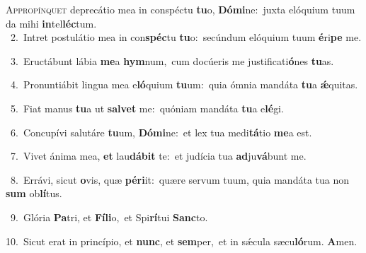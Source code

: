 \lettrine{\initial\textcolor{\initialcolor}{A}}{ppropínquet} deprecátio mea in conspéctu \textbf{tu}\-o, \textbf{Dó}\-\textbf{mi}ne:~\star juxta elóquium tuum da mihi \textbf{in}\-tel\-\textbf{léc}\-tum.\\
{\numbfont\textcolor{\numbcolor}{~2.}}~Intret postulátio mea in con\-\textbf{spéc}\-tu \textbf{tu}\-o:~\star secúndum elóquium tuum \textbf{é}\-ri\textbf{pe} me.\par
{\numbfont\textcolor{\numbcolor}{~3.}}~Eructábunt lábia \textbf{me}\-a \textbf{hym}\-num,~\star cum docúeris me justificati\-\textbf{ó}\-nes \textbf{tu}\-as.\par
{\numbfont\textcolor{\numbcolor}{~4.}}~Pronuntiábit lingua mea e\-\textbf{ló}\-quium \textbf{tu}\-um:~\star quia ómnia mandáta \textbf{tu}\-a \textbf{ǽ}\-quitas.\par
{\numbfont\textcolor{\numbcolor}{~5.}}~Fiat manus \textbf{tu}\-a ut \textbf{sal}\-\textbf{vet} me:~\star quóniam mandáta \textbf{tu}\-a e\-\textbf{lé}\-gi.\par
{\numbfont\textcolor{\numbcolor}{~6.}}~Concupívi salutáre \textbf{tu}\-um, \textbf{Dó}\-\textbf{mi}ne:~\star et lex tua medi\-\textbf{tá}\-tio \textbf{me}\-a est.\par
{\numbfont\textcolor{\numbcolor}{~7.}}~Vivet ánima mea, \textbf{et} lau\-\textbf{dá}\-\textbf{bit} te:~\star et judícia tua \textbf{ad}\-ju\-\textbf{vá}\-bunt me.\par
{\numbfont\textcolor{\numbcolor}{~8.}}~Errávi, sicut \textbf{o}\-vis, quæ \textbf{pér}\-\textbf{i}it:~\star quære servum tuum, quia mandáta tua non \textbf{sum} ob\-\textbf{lí}\-tus.\par
{\numbfont\textcolor{\numbcolor}{~9.}}~Glória \textbf{Pa}\-tri, et \textbf{Fí}\-\textbf{li}o,~\star et Spi\-\textbf{rí}\-tui \textbf{Sanc}\-to.\par
{\numbfont\textcolor{\numbcolor}{10.}}~Sicut erat in princípio, et \textbf{nunc}\-, et \textbf{sem}\-per,~\star et in sǽcula sæcu\-\textbf{ló}\-rum. \textbf{A}\-men.\par
